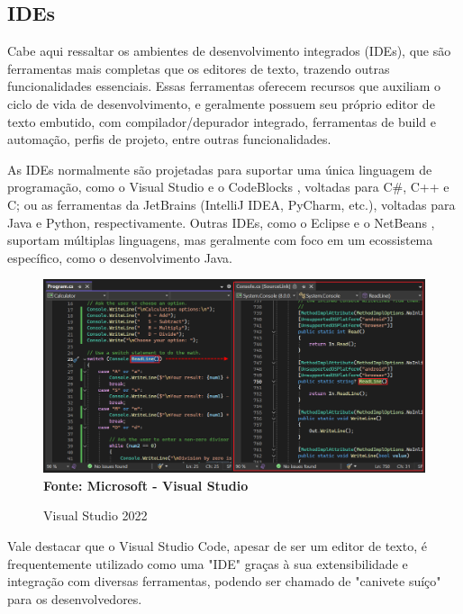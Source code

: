 \subsection{IDEs}

Cabe aqui ressaltar os ambientes de desenvolvimento integrados (IDEs), que são
ferramentas mais completas que os editores de texto, trazendo outras funcionalidades
essenciais. Essas ferramentas oferecem recursos que auxiliam o ciclo de vida de
desenvolvimento, e geralmente possuem seu próprio editor de texto embutido, com
compilador/depurador integrado, ferramentas de build e automação, perfis de
projeto, entre outras funcionalidades.

As IDEs normalmente são projetadas para suportar uma única linguagem de programação,
como o Visual Studio \cite{visual_studio} e o CodeBlocks \cite{codeblocks}, voltadas
para C\#, C++ e C; ou as ferramentas da JetBrains \cite{jetbrains_tools} (IntelliJ
IDEA, PyCharm, etc.), voltadas para Java e Python, respectivamente. Outras IDEs,
como o Eclipse \cite{eclipse_ide} e o NetBeans \cite{netbeans_ide}, suportam
múltiplas linguagens, mas geralmente com foco em um ecossistema específico, como
o desenvolvimento Java.

\FloatBarrier
\begin{figure}[!htbp]
    \centering
    \caption{Visual Studio 2022}
    \includegraphics[scale=0.4]{imagens/VisualStudio.png}
    \\\textbf{Fonte: Microsoft - Visual Studio} \label{fig:VisualStudio}
\end{figure}
\FloatBarrier

Vale destacar que o Visual Studio Code, apesar de ser um editor de texto, é frequentemente
utilizado como uma "IDE" graças à sua extensibilidade e integração com diversas ferramentas,
podendo ser chamado de "canivete suíço" para os desenvolvedores.


